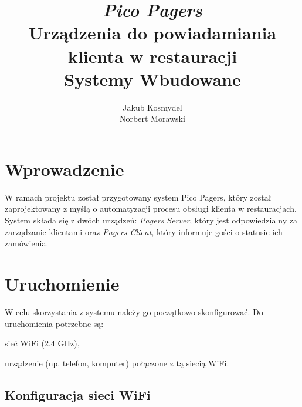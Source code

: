 \documentclass[12pt]{article}
\let\tempone\itemize
\let\temptwo\enditemize
\renewenvironment{itemize}{\tempone\setlength{\itemsep}{0cm}}{\temptwo}
\begin{document}
	
	\title{\textit{Pico Pagers} \\ Urządzenia do powiadamiania klienta w restauracji \\
		\vspace{0.2cm}
		\large Systemy Wbudowane}
	\author{Jakub Kosmydel \\
		Norbert Morawski}
	
	\maketitle
	\tableofcontents
	\pagebreak
	
	
	\section{Wprowadzenie}
		W ramach projektu został przygotowany system Pico Pagers, który został zaprojektowany z myślą o automatyzacji procesu obsługi klienta w restauracjach. System składa się z dwóch urządzeń: \emph{Pagers Server}, który jest odpowiedzialny za zarządzanie klientami oraz \emph{Pagers Client}, który informuje gości o statusie ich zamówienia.

    \section{Uruchomienie}
        W celu skorzystania z systemu należy go początkowo skonfigurować. Do uruchomienia potrzebne są:
        \begin{itemize}
            \item sieć WiFi (2.4 GHz),
            \item urządzenie (np. telefon, komputer) połączone z tą siecią WiFi.
        \end{itemize}
        \subsection{Konfiguracja sieci WiFi}
\end{document}
